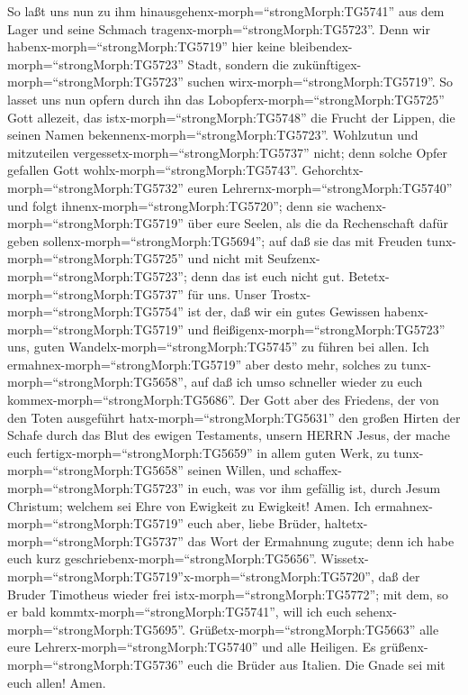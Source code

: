  So laßt uns nun zu ihm
hinausgehenx-morph=``strongMorph:TG5741'' aus dem Lager und seine
Schmach tragenx-morph=``strongMorph:TG5723''.  Denn wir
habenx-morph=``strongMorph:TG5719'' hier keine
bleibendex-morph=``strongMorph:TG5723'' Stadt, sondern die
zukünftigex-morph=``strongMorph:TG5723'' suchen
wirx-morph=``strongMorph:TG5719''.  So lasset uns nun
opfern durch ihn das Lobopferx-morph=``strongMorph:TG5725'' Gott
allezeit, das istx-morph=``strongMorph:TG5748'' die Frucht der Lippen,
die seinen Namen bekennenx-morph=``strongMorph:TG5723''. 
Wohlzutun und mitzuteilen vergessetx-morph=``strongMorph:TG5737'' nicht;
denn solche Opfer gefallen Gott wohlx-morph=``strongMorph:TG5743''.
 Gehorchtx-morph=``strongMorph:TG5732'' euren
Lehrernx-morph=``strongMorph:TG5740'' und folgt
ihnenx-morph=``strongMorph:TG5720''; denn sie
wachenx-morph=``strongMorph:TG5719'' über eure Seelen, als die da
Rechenschaft dafür geben sollenx-morph=``strongMorph:TG5694''; auf daß
sie das mit Freuden tunx-morph=``strongMorph:TG5725'' und nicht mit
Seufzenx-morph=``strongMorph:TG5723''; denn das ist euch nicht gut.
 Betetx-morph=``strongMorph:TG5737'' für uns. Unser
Trostx-morph=``strongMorph:TG5754'' ist der, daß wir ein gutes Gewissen
habenx-morph=``strongMorph:TG5719'' und
fleißigenx-morph=``strongMorph:TG5723'' uns, guten
Wandelx-morph=``strongMorph:TG5745'' zu führen bei allen. 
Ich ermahnex-morph=``strongMorph:TG5719'' aber desto mehr, solches zu
tunx-morph=``strongMorph:TG5658'', auf daß ich umso schneller wieder zu
euch kommex-morph=``strongMorph:TG5686''.  Der Gott aber
des Friedens, der von den Toten ausgeführt
hatx-morph=``strongMorph:TG5631'' den großen Hirten der Schafe durch das
Blut des ewigen Testaments, unsern HERRN Jesus,  der mache
euch fertigx-morph=``strongMorph:TG5659'' in allem guten Werk, zu
tunx-morph=``strongMorph:TG5658'' seinen Willen, und
schaffex-morph=``strongMorph:TG5723'' in euch, was vor ihm gefällig ist,
durch Jesum Christum; welchem sei Ehre von Ewigkeit zu Ewigkeit! Amen.
 Ich ermahnex-morph=``strongMorph:TG5719'' euch aber, liebe
Brüder, haltetx-morph=``strongMorph:TG5737'' das Wort der Ermahnung
zugute; denn ich habe euch kurz
geschriebenx-morph=``strongMorph:TG5656''. 
Wissetx-morph=``strongMorph:TG5719''\textbar x-morph=``strongMorph:TG5720'',
daß der Bruder Timotheus wieder frei istx-morph=``strongMorph:TG5772'';
mit dem, so er bald kommtx-morph=``strongMorph:TG5741'', will ich euch
sehenx-morph=``strongMorph:TG5695''. 
Grüßetx-morph=``strongMorph:TG5663'' alle eure
Lehrerx-morph=``strongMorph:TG5740'' und alle Heiligen. Es
grüßenx-morph=``strongMorph:TG5736'' euch die Brüder aus Italien.
 Die Gnade sei mit euch allen! Amen.
